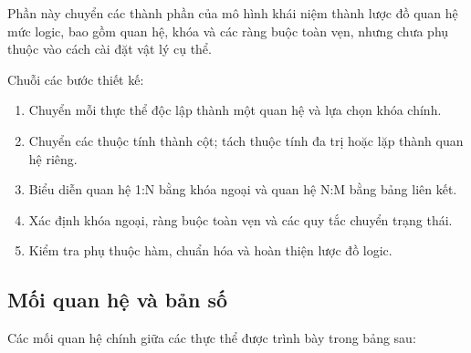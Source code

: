 Phần này chuyển các thành phần của mô hình khái niệm thành lược đồ quan hệ mức logic, bao gồm quan hệ, khóa và các ràng buộc toàn vẹn, nhưng chưa phụ thuộc vào cách cài đặt vật lý cụ thể.

Chuỗi các bước thiết kế:
\begin{enumerate}
    \item Chuyển mỗi thực thể độc lập thành một quan hệ và lựa chọn khóa chính.
    \item Chuyển các thuộc tính thành cột; tách thuộc tính đa trị hoặc lặp thành quan hệ riêng.
    \item Biểu diễn quan hệ 1:N bằng khóa ngoại và quan hệ N:M bằng bảng liên kết.
    \item Xác định khóa ngoại, ràng buộc toàn vẹn và các quy tắc chuyển trạng thái.
    \item Kiểm tra phụ thuộc hàm, chuẩn hóa và hoàn thiện lược đồ logic.
\end{enumerate}

\subsection{Mối quan hệ và bản số}\label{s:relationships}

Các mối quan hệ chính giữa các thực thể được trình bày trong bảng sau:

